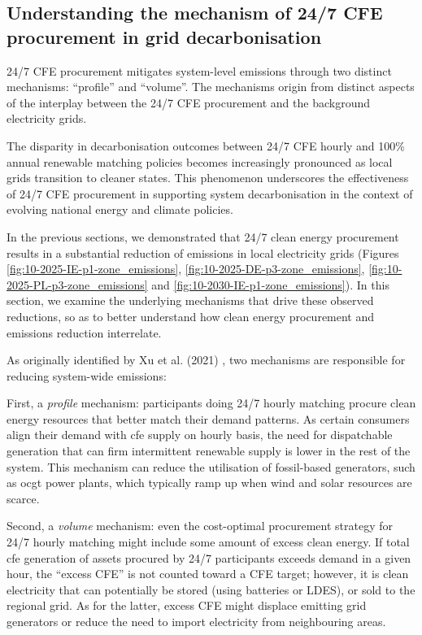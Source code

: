 \subsection{Understanding the mechanism of 24/7 CFE procurement in grid decarbonisation}
\label{subsec:mechanisms}

\begin{res}
    24/7 CFE procurement mitigates system-level \co \newline 
    emissions through two distinct mechanisms: \enquote{profile} and \enquote{volume}. The mechanisms origin from distinct aspects of the interplay between the 24/7 CFE procurement and the background electricity grids.
\end{res}

\begin{res}
    The disparity in decarbonisation outcomes between 24/7 CFE hourly and 100\% annual renewable matching policies becomes increasingly pronounced as local grids transition to cleaner states. This phenomenon underscores the effectiveness of 24/7 CFE procurement in supporting system decarbonisation in the context of evolving national energy and climate policies.
\end{res}

In the previous sections, we demonstrated that 24/7 clean energy procurement results in a substantial reduction of \co emissions in local electricity grids (Figures \ref{fig:10-2025-IE-p1-zone_emissions}, \ref{fig:10-2025-DE-p3-zone_emissions}, \ref{fig:10-2025-PL-p3-zone_emissions} and \ref{fig:10-2030-IE-p1-zone_emissions}).
In this section, we examine the underlying mechanisms that drive these observed reductions, so as to better understand how clean energy procurement and emissions reduction interrelate.

As originally identified by Xu et al. (2021) \cite{xu-247CFE-report}, two mechanisms are responsible for reducing system-wide emissions:

First, a \textit{profile} mechanism: participants doing 24/7 hourly matching procure clean energy resources that better match their demand patterns. 
As certain consumers align their demand with \gls{cfe} supply on hourly basis, the need for dispatchable generation that can firm intermittent renewable supply is lower in the rest of the system. 
This mechanism can reduce the utilisation of fossil-based generators, such as \gls{ocgt} power plants, which typically ramp up when wind and solar resources are scarce.

Second, a \textit{volume} mechanism: even the cost-optimal procurement strategy for 24/7 hourly matching might include some amount of excess clean energy.
If total \gls{cfe} generation of assets procured by 24/7 participants exceeds demand in a given hour, the \enquote{excess CFE} is not counted toward a CFE target; however, it is clean electricity that can potentially be stored (using batteries or LDES), or sold to the regional grid.
As for the latter, excess CFE might displace emitting grid generators or reduce the need to import electricity from neighbouring areas.

